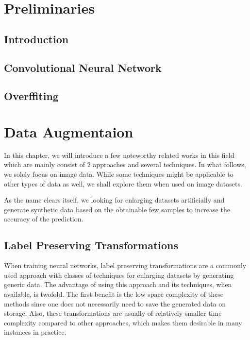 \chapter{Preliminaries}
\section{Introduction}
\section{Convolutional Neural Network}
\section{Overffiting}


\chapter{Data Augmentaion}

In this chapter, we will introduce a few noteworthy related works in this field which are mainly consist of $2$ approaches and several techniques.
In what follows, we solely focus on image data.  While some techniques might be applicable to other
types of data as well, we shall explore them when used on image datasets.

As the name clears itself, we looking for enlarging datasets artificially and generate synthetic
data based on the obtainable few samples to increase the accuracy of the prediction.

\section{Label Preserving Transformations}
\label{tit:label-preserving}
When training neural networks, label preserving transformations are a commonly used approach with classes of
techniques for enlarging datasets by generating generic data. The advantage of using this approach
and its techniques, when available, is twofold. The first benefit is the low space complexity of these
methods since one does not necessarily need to save the generated data on storage. Also, these
transformations are usually of relatively smaller time complexity compared to other approaches,
which makes them desirable in many instances in practice.

